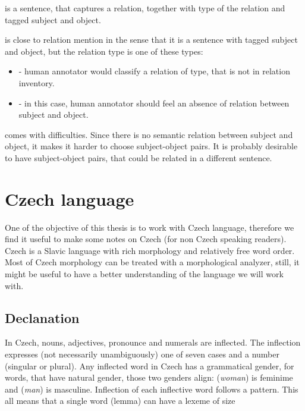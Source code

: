  is a sentence, that captures a relation, together with type of the relation and tagged subject and object. 

 is close to relation mention in the sense that it is a sentence with tagged subject and object, but the relation type is one of these types: 
\begin{itemize}
\item {} - human annotator would classify a relation of type, that is not in relation inventory. 
\item {} - in this case, human annotator should feel an absence of relation between subject and object.  

\end{itemize}

 comes with difficulties. Since there is no semantic relation between subject and object, it makes it harder to choose subject-object pairs. It is probably desirable to have subject-object pairs, that could be related in a different sentence. 

 

 


\section{Czech language}
One of the objective of this thesis is to work with Czech language, therefore we find it useful to make some notes on Czech (for non Czech speaking readers). Czech is a Slavic language with rich morphology and relatively free word order. Most of Czech morphology can be treated with a morphological analyzer, still, it might be useful to have a better understanding of the language we will work with.

\subsection{Declanation}
In Czech, nouns, adjectives, pronounce and numerals are inflected. The inflection expresses (not necessarily unambiguously) one of seven cases and a number (singular or plural). Any inflected word in Czech has a grammatical gender, for words, that have natural gender, those two genders align:  (\textit{woman}) is feminime and  (\textit{man}) is masculine. Inflection of each inflective word follows a pattern. This all means that a single word (lemma) can have a lexeme of size 

